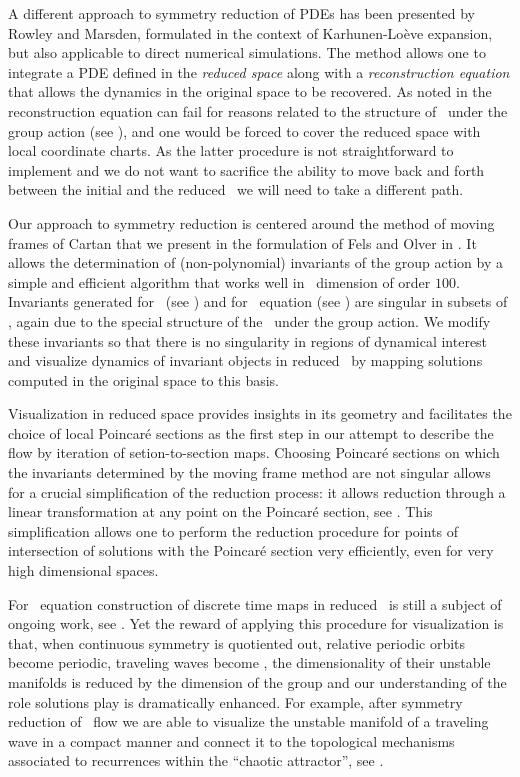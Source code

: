 A different approach to symmetry reduction of PDEs has been
presented by Rowley and
Marsden, formulated in the
context of {Karhunen-Lo\`{e}ve} expansion, but also applicable
to direct numerical simulations.
The method allows one to integrate a PDE defined in the
\emph{reduced space} along with a \emph{reconstruction
equation} that allows the dynamics in the original space to
be recovered. As noted in
 the reconstruction
equation can fail for reasons related to the structure of
\statesp\ under the group action (see ),
and one would be forced to cover the reduced space with local
coordinate charts. As the latter procedure is not
straightforward to implement and we do not want to sacrifice
the ability to move back and forth between the initial and
the reduced \statesp\ we will need to take a different path.

Our approach to symmetry reduction is centered around the
method of moving frames of Cartan that we
present in the formulation of Fels and Olver
in . It allows the determination of
(non-polynomial) invariants of the group action by a simple
and efficient algorithm that works well in \statesp\
dimension of order $100$. Invariants generated for \CLe\ (see
) and for \KS\ equation (see
) are singular in subsets of \statesp,
again due to the special structure of the \statesp\ under the
group action. We modify these invariants so that there is no
singularity in regions of dynamical interest and visualize
dynamics of invariant objects in reduced \statesp\ by mapping
solutions computed in the original space to this basis.


Visualization in reduced space provides insights in its
geometry and facilitates the choice of local Poincar\'e
sections as the first step in our attempt to describe the
flow by iteration of setion-to-section maps.
Choosing Poincar\'e sections on which the invariants
determined by the moving frame method are not singular allows
for a crucial simplification of the reduction process: it
allows reduction through a linear transformation at
any point on the Poincar\'e section, see .
This simplification allows one to perform the reduction
procedure for points of intersection of solutions with the
Poincar\'e section very efficiently, even for very high
dimensional spaces.

For \KS\ equation construction of discrete time maps in
reduced \statesp\ is still a subject of ongoing work, see
. Yet the reward of applying this
procedure for visualization is that, when continuous symmetry
is quotiented out, relative periodic orbits become periodic,
traveling waves become \eqva, the dimensionality of their
unstable manifolds is reduced by the dimension of the group
and our understanding of the role solutions play is
dramatically enhanced.
For example, after symmetry reduction of
\KS\ flow we are able to visualize the unstable manifold of a
traveling wave in a compact manner and connect it to the
topological mechanisms associated to recurrences within the
``chaotic attractor'', see .

